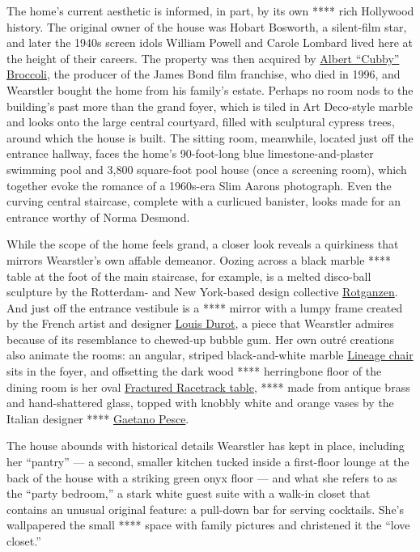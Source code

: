 The home's current aesthetic is informed, in part, by its own **** rich
Hollywood history. The original owner of the house was Hobart Bosworth,
a silent-film star, and later the 1940s screen idols William Powell and
Carole Lombard lived here at the height of their careers. The property
was then acquired by
\href{https://www.nytimes.com/1996/06/29/arts/albert-broccoli-film-producer-dies-at-87.html}{Albert
``Cubby'' Broccoli}, the producer of the James Bond film franchise, who
died in 1996, and Wearstler bought the home from his family's estate.
Perhaps no room nods to the building's past more than the grand foyer,
which is tiled in Art Deco-style marble and looks onto the large central
courtyard, filled with sculptural cypress trees, around which the house
is built. The sitting room, meanwhile, located just off the entrance
hallway, faces the home's 90-foot-long blue limestone-and-plaster
swimming pool and 3,800 square-foot pool house (once a screening room),
which together evoke the romance of a 1960s-era Slim Aarons photograph.
Even the curving central staircase, complete with a curlicued banister,
looks made for an entrance worthy of Norma Desmond.

While the scope of the home feels grand, a closer look reveals a
quirkiness that mirrors Wearstler's own affable demeanor. Oozing across
a black marble **** table at the foot of the main staircase, for
example, is a melted disco-ball sculpture by the Rotterdam- and New
York-based design collective
\href{https://www.rotganzen.com/}{Rotganzen}. And just off the entrance
vestibule is a **** mirror with a lumpy frame created by the French
artist and designer \href{http://www.louisdurot.org/fr/}{Louis Durot}, a
piece that Wearstler admires because of its resemblance to chewed-up
bubble gum. Her own outré creations also animate the rooms: an angular,
striped black-and-white marble
\href{https://www.kellywearstler.com/seating/lineage-chair/FCD15001.html?cgid=seating\&start=56\#start=57}{Lineage
chair} sits in the foyer, and offsetting the dark wood **** herringbone
floor of the dining room is her oval
\href{https://www.kellywearstler.com/tables/fractured-racetrack-table/FTA17007.html?start=10\&cgid=tables\#start=11}{Fractured
Racetrack table}, **** made from antique brass and hand-shattered glass,
topped with knobbly white and orange vases by the Italian designer ****
\href{http://www.gaetanopesce.com/}{Gaetano Pesce}.

The house abounds with historical details Wearstler has kept in place,
including her ``pantry'' --- a second, smaller kitchen tucked inside a
first-floor lounge at the back of the house with a striking green onyx
floor --- and what she refers to as the ``party bedroom,'' a stark white
guest suite with a walk-in closet that contains an unusual original
feature: a pull-down bar for serving cocktails. She's wallpapered the
small **** space with family pictures and christened it the ``love
closet.''

